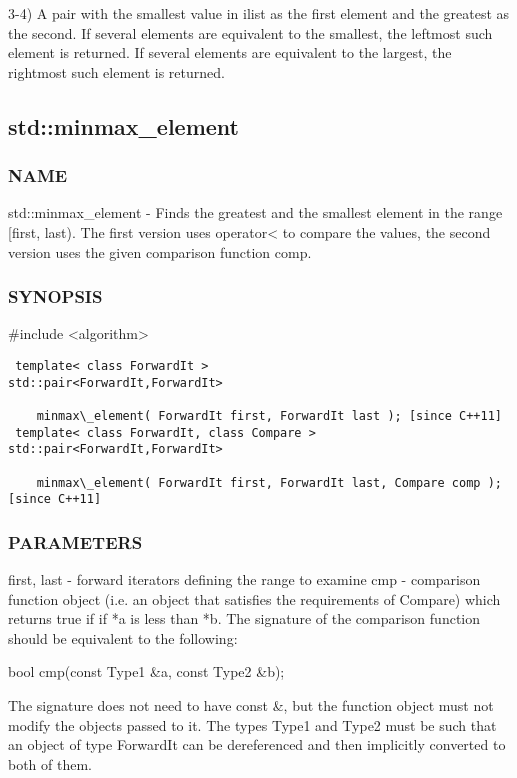 3-4) A pair with the smallest value in ilist as the first element and the greatest as the second. If several elements are equivalent to the smallest, the leftmost such element is returned. If several elements are equivalent to the largest, the rightmost such element is returned.



\subsection{std::minmax\_element}

\subsubsection{NAME}
std::minmax\_element - Finds the greatest and the smallest element in the range [first, last). The first version uses operator< to compare the values, the second version uses the given comparison function comp.

\subsubsection{SYNOPSIS}
\#include <algorithm>

\begin{lstlisting}
 template< class ForwardIt >
std::pair<ForwardIt,ForwardIt>

    minmax\_element( ForwardIt first, ForwardIt last ); [since C++11]
 template< class ForwardIt, class Compare >
std::pair<ForwardIt,ForwardIt>

    minmax\_element( ForwardIt first, ForwardIt last, Compare comp ); [since C++11]
\end{lstlisting}

\subsubsection{PARAMETERS}
first, last - forward iterators defining the range to examine
cmp - comparison function object (i.e. an object that satisfies the requirements of Compare) which returns true if  if *a is less than *b.
The signature of the comparison function should be equivalent to the following:

 bool cmp(const Type1 \&a, const Type2 \&b);

The signature does not need to have const \&, but the function object must not modify the objects passed to it.
The types Type1 and Type2 must be such that an object of type ForwardIt can be dereferenced and then implicitly converted to both of them.

